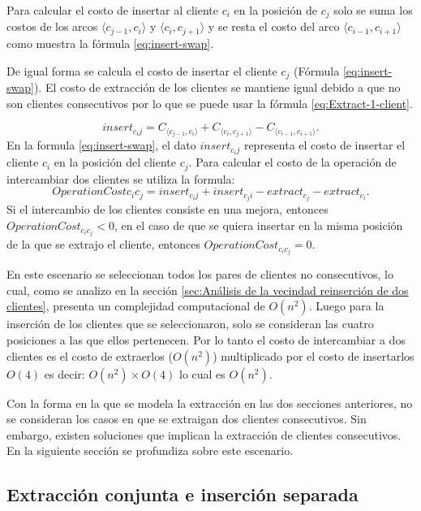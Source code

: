 \documentclass[12pt]{report}
\begin{document}
        Para calcular el costo de insertar al cliente $c_i$ en la posición de $c_j$ solo se suma los costos de los arcos $\langle c_{j-1},c_i \rangle$ y $\langle c_i,c_{j+1} \rangle$ y se resta el costo del arco $\langle c_{i-1},c_{i+1} \rangle$ como muestra la fórmula \ref{eq:insert-swap}.

        De igual forma se calcula el costo de insertar el cliente $c_j$ (Fórmula \ref{eq:insert-swap}). El costo de extracción de los clientes se mantiene igual debido a que no son clientes consecutivos por lo que se puede usar la fórmula \ref{eq:Extract-1-client}.

    \begin{equation}
    	insert_{c_ij} = C_{\langle c_{j-1},c_i \rangle} + C_{\langle c_i,c_{j+1} \rangle} - C_{\langle c_{i-1},c_{i+1} \rangle} \text{.}
    	\label{eq:insert-swap}
    \end{equation}
    En la formula \ref{eq:insert-swap}, el dato $insert_{c_ij}$ representa el costo de insertar el cliente $c_i$ en la posición del cliente $c_j$.
    Para calcular el costo de la operación de intercambiar dos clientes se utiliza la formula:
    \begin{equation}
    	OperationCost{c_ic_j} = insert_{c_ij} + insert_{c_ji} - extract_{c_j} - extract_{c_i}.
    \end{equation}
	Si el intercambio de los clientes consiste en una mejora, entonces $OperationCost_{c_ic_j} < 0$, en el caso de que se quiera insertar en la misma posición de la que se extrajo el cliente, entonces $OperationCost_{c_ic_j} = 0$.

	En este escenario se seleccionan todos los pares de clientes no consecutivos, lo cual, como se analizo en la sección \ref{sec:Análisis de la vecindad reinserción de dos clientes}, presenta un complejidad computacional de $O(n^2)$. Luego para la inserción de los clientes que se seleccionaron, solo se consideran las cuatro posiciones a las que ellos pertenecen. Por lo tanto el costo de intercambiar a dos clientes es el costo de extraerlos ($O(n^2)$) multiplicado por el costo de insertarlos $O(4)$ es decir: $O(n^2) \times O(4)$ lo cual es $O(n^2)$.

	Con la forma en la que se modela la extracción en las dos secciones anteriores, no se consideran los casos en que se extraigan dos clientes consecutivos. Sin embargo, existen soluciones que implican la extracción de clientes consecutivos. En la siguiente sección se profundiza sobre este escenario.

	\subsection{Extracción conjunta e inserción separada}
	\label{sec:Extracción conjunta e inserción separada}
\end{document}
